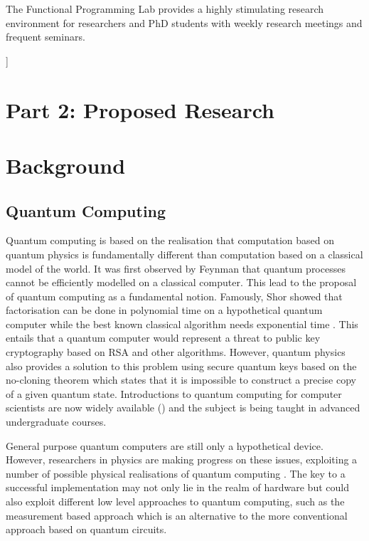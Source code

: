 \documentclass[a4paper]{article}
\begin{document}
The Functional Programming Lab provides a highly stimulating
research environment for researchers and PhD students with weekly
research meetings and frequent seminars. %

\vspace{1em}
]

{\footnotesize
{}
}

\newpage

\section*{Part 2: Proposed Research}


\section{Background}

\subsection*{Quantum Computing}
Quantum computing is based on the realisation that computation based
on quantum physics is fundamentally different than computation based
on a classical model of the world. It was first observed by Feynman 
that quantum processes cannot be efficiently modelled on a classical
computer. This lead to the proposal of quantum computing as a
fundamental notion. Famously, Shor showed that factorisation can be
done in polynomial time on a hypothetical quantum computer
 while the
best known classical algorithm needs exponential time
. This entails
that a quantum computer would represent a threat to public key
cryptography based on RSA  and other algorithms. However, quantum
physics also provides a solution to this problem using secure quantum
keys based on the no-cloning theorem which states that it is
impossible to construct a precise copy of a given quantum
state. Introductions to quantum computing for computer scientists are
now widely available () and the
subject is being taught in advanced undergraduate courses. 

General purpose quantum computers are still only a hypothetical
device. However, researchers in physics are making progress on these
issues, exploiting a number of possible physical realisations of quantum
computing . The key to a successful
implementation may not only lie in the realm of hardware but could
also exploit different low level approaches to quantum computing, such
as the measurement based approach  
which is an alternative to the more
conventional approach based on quantum circuits.
\end{document}
